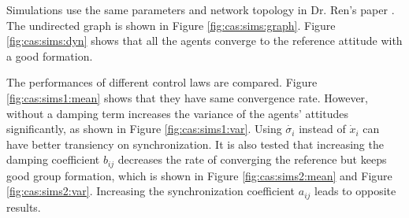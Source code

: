 Simulations use the same parameters and network topology in Dr. Ren's paper \cite{5229134}.
The undirected graph is shown in Figure \ref{fig:cas:sims:graph}.
Figure \ref{fig:cas:sims:dyn} shows that all the agents converge to the reference attitude with a good formation.

The performances of different control laws are compared.
Figure \ref{fig:cas:sims1:mean} shows that they have same convergence rate.
However, without a damping term increases the variance of the agents' attitudes significantly, as shown in Figure \ref{fig:cas:sims1:var}.
Using $ \dot{\sigma_{i}} $ instead of $ \dot{x}_{i} $ can have better transiency on synchronization.
It is also tested that increasing the damping coefficient $ b_{ij} $ decreases the rate of converging the reference but keeps good group formation, which is shown in Figure \ref{fig:cas:sims2:mean} and Figure \ref{fig:cas:sims2:var}.
Increasing the synchronization coefficient $ a_{ij} $ leads to opposite results.

